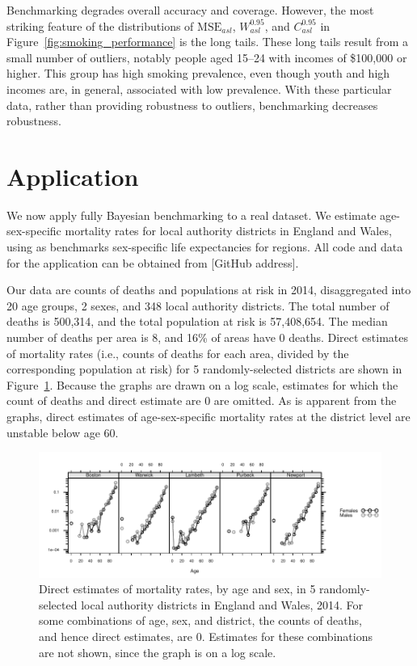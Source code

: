 \documentclass[12pt]{article}
\begin{document}
Benchmarking degrades overall accuracy and coverage. However, the most striking feature of the distributions of $\text{MSE}_{asl}$, $W_{asl}^{0.95}$, and $C_{asl}^{0.95}$ in  Figure~\ref{fig:smoking_performance} is the long tails.  These long tails result from a small number of outliers, notably people aged 15--24 with incomes of \$100,000 or higher.  This group has high smoking prevalence, even though youth and high incomes are, in general, associated with low prevalence.  With these particular data, rather than providing robustness to outliers, benchmarking decreases robustness.

\section{Application}
  \label{sec:application}

We now apply fully Bayesian benchmarking to a real dataset.  We estimate age-sex-specific mortality rates for local authority districts in England and Wales, using as benchmarks sex-specific life expectancies for regions.  All code and data for the application can be obtained from [GitHub address].

Our data are counts of deaths and populations at risk in 2014, disaggregated into 20 age groups, 2 sexes, and 348 local authority districts. The total number of deaths is 500,314, and the total population at risk is 57,408,654.  The median number of deaths per area is 8, and 16\% of areas have 0 deaths.  Direct estimates of mortality rates (i.e., counts of deaths for each area, divided by the corresponding population at risk) for 5 randomly-selected districts are shown in Figure~\ref{fig:mx_examples}.  Because the graphs are drawn on a log scale, estimates for which the count of deaths and direct estimate are 0 are omitted.  As is apparent from the graphs, direct estimates of age-sex-specific mortality rates at the district level are unstable below age 60.

\begin{figure}
  \center
    \includegraphics{out/mortality/mortality_mx_examples}
  \caption{\small Direct estimates of mortality rates, by age and sex, in 5 randomly-selected local authority districts in England and Wales, 2014. For some combinations of age, sex, and district, the counts of deaths, and hence direct estimates, are 0. Estimates for these combinations are not shown, since the graph is on a log scale. }
  \label{fig:mx_examples}
\end{figure}
\end{document}
